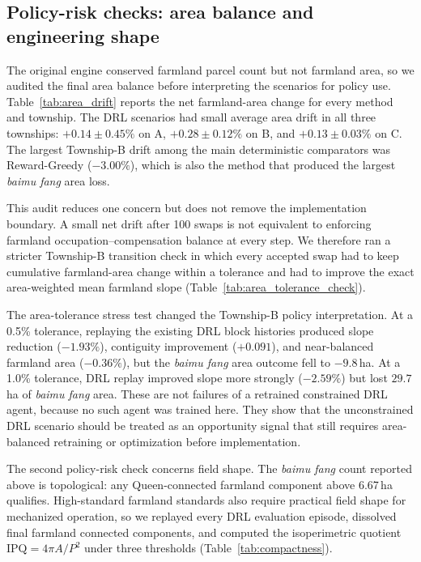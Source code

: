 \documentclass[preprint,12pt]{elsarticle}
\begin{document}
\subsection{Policy-risk checks: area balance and engineering shape}
\label{sec:area_balance_checks}

The original engine conserved farmland parcel count but not farmland area, so we audited the final area balance before interpreting the scenarios for policy use. Table~\ref{tab:area_drift} reports the net farmland-area change for every method and township. The DRL scenarios had small average area drift in all three townships: $+0.14\pm0.45\%$ on A, $+0.28\pm0.12\%$ on B, and $+0.13\pm0.03\%$ on C. The largest Township-B drift among the main deterministic comparators was Reward-Greedy ($-3.00\%$), which is also the method that produced the largest \textit{baimu fang} area loss.



This audit reduces one concern but does not remove the implementation boundary. A small net drift after 100 swaps is not equivalent to enforcing farmland occupation--compensation balance at every step. We therefore ran a stricter Township-B transition check in which every accepted swap had to keep cumulative farmland-area change within a tolerance and had to improve the exact area-weighted mean farmland slope (Table~\ref{tab:area_tolerance_check}).



The area-tolerance stress test changed the Township-B policy interpretation. At a 0.5\% tolerance, replaying the existing DRL block histories produced slope reduction ($-1.93\%$), contiguity improvement ($+0.091$), and near-balanced farmland area ($-0.36\%$), but the \textit{baimu fang} area outcome fell to $-9.8$\,ha. At a 1.0\% tolerance, DRL replay improved slope more strongly ($-2.59\%$) but lost $29.7$\,ha of \textit{baimu fang} area. These are not failures of a retrained constrained DRL agent, because no such agent was trained here. They show that the unconstrained DRL scenario should be treated as an opportunity signal that still requires area-balanced retraining or optimization before implementation.

The second policy-risk check concerns field shape. The \textit{baimu fang} count reported above is topological: any Queen-connected farmland component above 6.67\,ha qualifies. High-standard farmland standards also require practical field shape for mechanized operation, so we replayed every DRL evaluation episode, dissolved final farmland connected components, and computed the isoperimetric quotient $\mathrm{IPQ}=4\pi A/P^2$ under three thresholds (Table~\ref{tab:compactness}).
\end{document}
